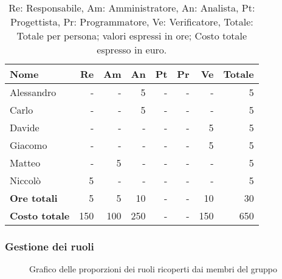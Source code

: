 \begin{table}[H]
	\centering
	\begin{tabular}{l|r|r|r|r|r|r|r}
		\textbf{Nome}         & \textbf{Re} & \textbf{Am} & \textbf{An} & \textbf{Pt} & \textbf{Pr} & \textbf{Ve} & \textbf{Totale} \\
		\hline
		Alessandro            & -           & -           & 5           & -           & -           & -           & 5               \\
		Carlo                 & -           & -           & 5           & -           & -           & -           & 5               \\
		Davide                & -           & -           & -           & -           & -           & 5           & 5               \\
		Giacomo               & -           & -           & -           & -           & -           & 5           & 5               \\
		Matteo                & -           & 5           & -           & -           & -           & -           & 5               \\
		Niccolò               & 5           & -           & -           & -           & -           & -           & 5               \\
		\hline
		\textbf{Ore totali}   & 5           & 5           & 10          & -           & -           & 10          & 30              \\
		\textbf{Costo totale} & 150         & 100         & 250         & -           & -           & 150         & 650
	\end{tabular}
	\caption{Re: Responsabile, Am: Amministratore, An: Analista, Pt: Progettista,
		Pr: Programmatore, Ve: Verificatore, Totale: Totale per persona; valori espressi in ore; Costo totale espresso in euro.}
\end{table}

\newpage
\subsubsection{Gestione dei ruoli}

\begin{figure}[h]
	\centering
	\caption{Grafico delle proporzioni dei ruoli ricoperti dai membri del gruppo}
\end{figure}

